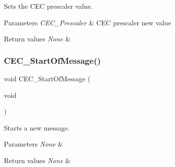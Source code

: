 Sets the C\+EC prescaler value. 


\begin{DoxyParams}{Parameters}
{\em C\+E\+C\+\_\+\+Prescaler} & C\+EC prescaler new value \\
\hline
\end{DoxyParams}

\begin{DoxyRetVals}{Return values}
{\em None} & \\
\hline
\end{DoxyRetVals}
\mbox{\label{group___c_e_c___private___functions_ga71e700461ffe7820d9e1c75da65fd0fb}} 
\subsubsection{\texorpdfstring{CEC\_StartOfMessage()}{CEC\_StartOfMessage()}}
{\footnotesize\ttfamily void C\+E\+C\+\_\+\+Start\+Of\+Message (\begin{DoxyParamCaption}\item[{void}]{ }\end{DoxyParamCaption})}



Starts a new message. 


\begin{DoxyParams}{Parameters}
{\em None} & \\
\hline
\end{DoxyParams}

\begin{DoxyRetVals}{Return values}
{\em None} & \\
\hline
\end{DoxyRetVals}
